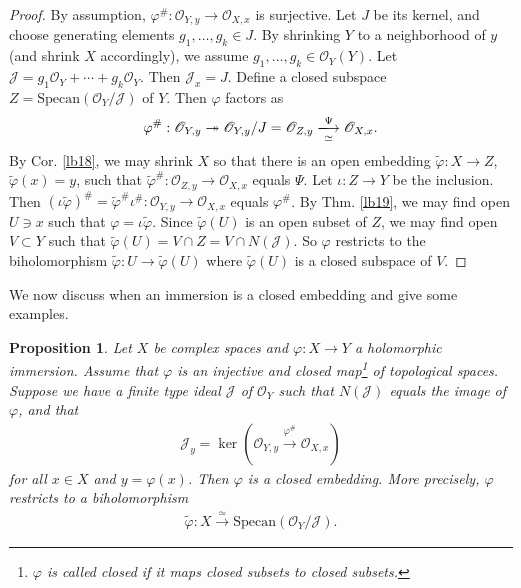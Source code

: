 \documentclass[12pt,b5paper,notitlepage]{report}
\theoremstyle{definition}
\theoremstyle{plain}
\newtheorem{pp}[df]{Proposition}
\newcommand{\mc}{\mathcal}
\newcommand{\wtd}{\widetilde}
\newcommand{\scr}{\mathscr}
\newcommand{\Specan}{\mathrm{Specan}}
\numberwithin{equation}{section}
\begin{document}
\begin{proof}
By assumption, $\varphi^\#:\scr O_{Y,y}\rightarrow\scr O_{X,x}$ is surjective. Let $J$ be its kernel, and choose generating elements $g_1,\dots,g_k\in J$. By shrinking $Y$ to a neighborhood of $y$ (and shrink $X$ accordingly), we assume $g_1,\dots,g_k\in\scr O_Y(Y)$. Let $\mc J=g_1\scr O_Y+\cdots+g_k\scr O_Y$. Then $\mc J_x=J$. Define a closed subspace $Z=\Specan(\scr O_Y/\mc J)$ of $Y$. Then $\varphi$ factors as
\begin{align*}
\varphi^\#:\scr O_{Y,y}\twoheadrightarrow \scr O_{Y,y}/J=\scr O_{Z,y}\xlongrightarrow[\simeq]{\Psi}\scr O_{X,x}.
\end{align*}
By Cor. \ref{lb18}, we may shrink $X$ so that there is an open embedding $\wtd\varphi:X\rightarrow Z$, $\wtd\varphi(x)=y$, such that $\wtd\varphi^\#:\scr O_{Z,y}\rightarrow\scr O_{X,x}$ equals $\Psi$. Let $\iota:Z\rightarrow Y$ be the inclusion. Then $(\iota\wtd\varphi)^\#=\wtd\varphi^\#\iota^\#:\scr O_{Y,y}\rightarrow\scr O_{X,x}$ equals $\varphi^\#$. By Thm. \ref{lb19}, we may find open $U\ni x$  such that $\varphi=\iota\wtd\varphi$. Since $\wtd\varphi(U)$ is an open subset of $Z$, we may find open $V\subset Y$ such that $\wtd\varphi(U)=V\cap Z=V\cap N(\mc J)$. So $\varphi$ restricts to the biholomorphism $\wtd\varphi:U\rightarrow\wtd\varphi(U)$ where $\wtd\varphi(U)$ is a closed subspace of $V$.
\end{proof}





We now discuss when an immersion is a closed embedding and give some examples.

\begin{pp}\label{lb14}
Let $X$ be complex spaces and  $\varphi:X\rightarrow Y$ a holomorphic immersion. Assume that $\varphi$ is an injective and closed map\footnote{$\varphi$ is called closed if it maps closed subsets to closed subsets.} of topological spaces. Suppose we have a finite type ideal $\mc J$ of $\scr O_Y$ such that $N(\mc J)$ equals the image of $\varphi$, and that
\begin{align}
\mc J_y=\ker(\scr O_{Y,y}\xrightarrow{\varphi^\#}\scr O_{X,x})\label{eq9}
\end{align}
for all $x\in X$ and $y=\varphi(x)$. Then $\varphi$ is a closed embedding. More precisely, $\varphi$ restricts to a biholomorphism
\begin{align}
\wtd\varphi:X\xrightarrow{\simeq}\Specan(\scr O_Y/\mc J).\label{eq10}
\end{align}
\end{pp}
\end{document}
